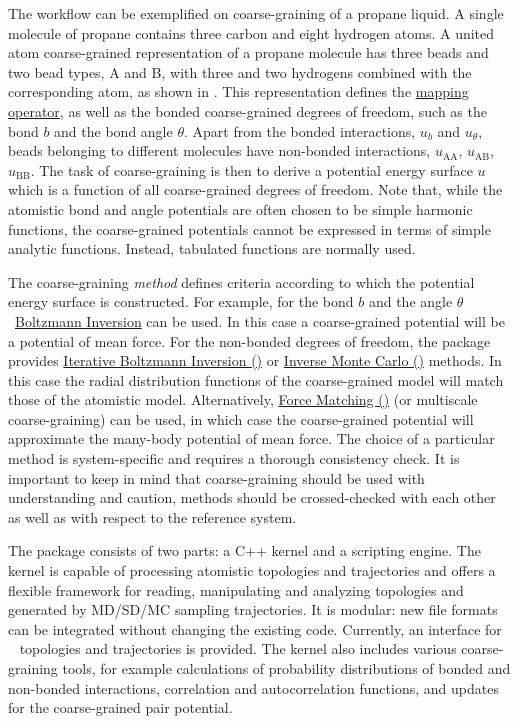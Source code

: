 The workflow can be exemplified on coarse-graining of a propane liquid. A single molecule of propane contains three carbon and eight hydrogen atoms. A united atom coarse-grained representation of a propane molecule has three beads and two bead types, A and B, with three and two hydrogens combined with the corresponding atom, as shown in . This representation defines the \hyperref[sec:mapping_operator]{mapping operator}, as well as the bonded coarse-grained degrees of freedom, such as the bond $b$ and the bond angle $\theta$. Apart from the bonded interactions, $u_b$ and $u_\theta$, beads belonging to different molecules have non-bonded interactions, $u_\text{AA}$, $u_\text{AB}$, $u_\text{BB}$. The task of coarse-graining is then to derive a potential energy surface $u$ which is a function of all coarse-grained degrees of freedom. Note that, while the atomistic bond and angle potentials are often chosen to be simple harmonic functions, the coarse-grained potentials cannot be expressed in terms of simple analytic functions. Instead, tabulated functions are normally used.

The coarse-graining {\em method} defines criteria according to which the potential energy surface is constructed. For example, for the bond $b$ and the angle $\theta$~\hyperref[sec:bi]{Boltzmann Inversion} can be used. In this case a coarse-grained potential will be a potential of mean force. For the non-bonded degrees of freedom, the package provides \hyperref[sec:ibi]{Iterative Boltzmann Inversion (\ibi)} or \hyperref[sec:imc]{Inverse Monte Carlo (\imc)} methods. In this case the radial distribution functions of the coarse-grained model will match those of the atomistic model. Alternatively, \hyperref[sec:fm]{Force Matching (\fm)} (or multiscale coarse-graining) can be used, in which case the coarse-grained potential will approximate the many-body potential of mean force. The choice of a particular method is system-specific and requires a thorough consistency check. It is important to keep in mind that coarse-graining should be used with understanding and caution, methods should be crossed-checked with each other as well as with respect to the reference system.

The package consists of two parts: a C++ kernel and a scripting engine. The kernel is capable of processing atomistic topologies and trajectories and offers a flexible framework for reading, manipulating and analyzing topologies and generated by MD/SD/MC sampling trajectories. It is modular: new file formats can be integrated without changing the existing code. Currently, an interface for \gromacs~\cite{gromacs4} topologies and trajectories is provided.
%
The kernel also includes various coarse-graining tools, for example calculations of probability distributions of bonded and non-bonded interactions, correlation and autocorrelation functions, and updates for the coarse-grained pair potential.

